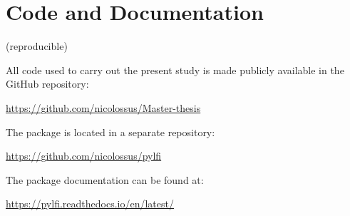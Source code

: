 \section{Code and Documentation}

(reproducible)

All code used to carry out the present study is made publicly available in the GitHub repository:

\begin{center}
    \url{https://github.com/nicolossus/Master-thesis}
\end{center}


The  package is located in a separate repository:

\begin{center}
    \url{https://github.com/nicolossus/pylfi}
\end{center}

The  package documentation can be found at:

\begin{center}
    \url{https://pylfi.readthedocs.io/en/latest/}
\end{center}
